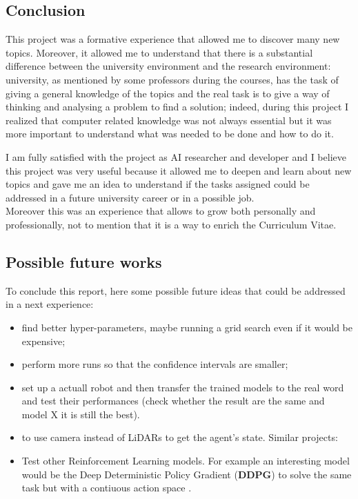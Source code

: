 \documentclass[14pt]{extarticle}
\def\sp{\vspace{5pt}}
\def\ppn{\vspace{10pt}}
\begin{document}
\newpage
\begin{center}
	\section{Conclusion}
	\sp
\end{center}
\begin{flushleft}

This project was a formative experience that allowed me to discover many new topics. Moreover, it allowed me to understand that there is a substantial difference between the university environment and the research environment: university, as mentioned by some professors during the courses, has the task of giving a general knowledge of the topics and the real task is to give a way of thinking and analysing a problem to find a solution; indeed, during this project I realized that computer related knowledge was not always essential but it was more important to understand what was needed to be done and how to do it.
\ppn

 I am fully satisfied with the project as AI researcher and developer and I believe this project was very useful because it allowed me to deepen and learn about new topics and gave me an idea to understand if the tasks assigned could be addressed in a future university career or in a possible job.
\\
Moreover this was an experience that allows to grow both personally and professionally, not to mention that it is a way to enrich the Curriculum Vitae.

\subsection{Possible future works}
To conclude this report, here some possible future ideas that could be addressed in a next experience:
\begin{itemize}
\item find better hyper-parameters, maybe running a grid search even if it would be expensive;
\item perform more runs so that the confidence intervals are smaller;
\item set up a actuall robot and then transfer the trained models to the real word and test their performances (check whether the result are the same and model X it is still the best).
\item to use camera instead of LiDARs to get the agent's state. Similar projects: \cite{Nworks1, Nworks2}
\item Test other Reinforcement Learning models. For example an interesting model would be the Deep Deterministic Policy Gradient (\textbf{DDPG}) to solve the same task but with a contiuous action space \cite{Nworks3}.
\end{itemize}

\end{flushleft}
\end{document}
